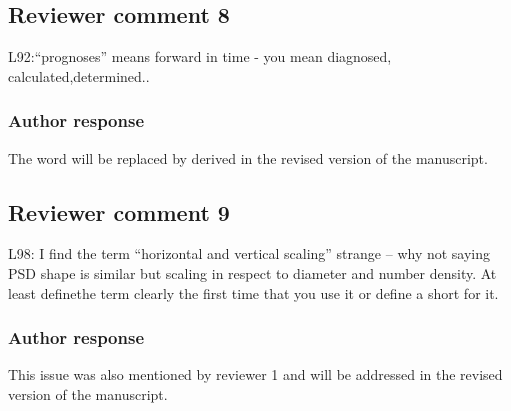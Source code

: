 \documentclass[11pt]{scrartcl}
\begin{document}
%



\subsection*{Reviewer comment 8}

L92:“prognoses”   means   forward   in   time   -   you   mean   diagnosed,   calculated,determined..

\subsubsection*{Author response}

The  word will be replaced by derived in the revised version of the manuscript.



\subsection*{Reviewer comment 9}

L98: I find the term “horizontal and vertical scaling” strange – why not saying
PSD shape is similar but scaling in respect to diameter and number density. At
least definethe term clearly the first time that you use it or define a short
for it.

\subsubsection*{Author response}
 
This issue was also mentioned by reviewer 1 and will be addressed in the revised
version of the manuscript.
\end{document}
